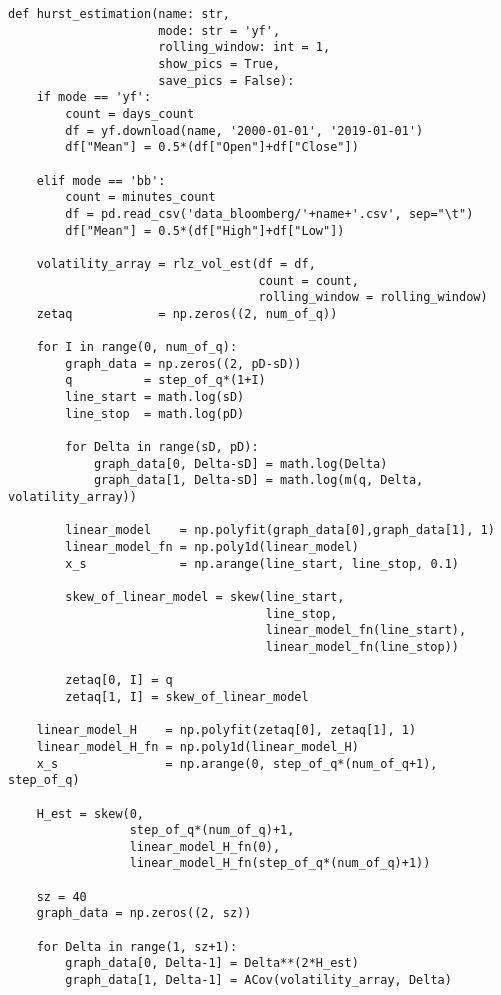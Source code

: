 \begin{verbatim}
def hurst_estimation(name: str, 
                     mode: str = 'yf', 
                     rolling_window: int = 1, 
                     show_pics = True, 
                     save_pics = False):
    if mode == 'yf':
        count = days_count
        df = yf.download(name, '2000-01-01', '2019-01-01')
        df["Mean"] = 0.5*(df["Open"]+df["Close"])

    elif mode == 'bb':
        count = minutes_count
        df = pd.read_csv('data_bloomberg/'+name+'.csv', sep="\t")  
        df["Mean"] = 0.5*(df["High"]+df["Low"])
        
    volatility_array = rlz_vol_est(df = df, 
                                   count = count, 
                                   rolling_window = rolling_window)
    zetaq            = np.zeros((2, num_of_q))

    for I in range(0, num_of_q):
        graph_data = np.zeros((2, pD-sD))
        q          = step_of_q*(1+I)
        line_start = math.log(sD)
        line_stop  = math.log(pD)
        
        for Delta in range(sD, pD):
            graph_data[0, Delta-sD] = math.log(Delta)
            graph_data[1, Delta-sD] = math.log(m(q, Delta, volatility_array))

        linear_model    = np.polyfit(graph_data[0],graph_data[1], 1)
        linear_model_fn = np.poly1d(linear_model)
        x_s             = np.arange(line_start, line_stop, 0.1)

        skew_of_linear_model = skew(line_start, 
                                    line_stop, 
                                    linear_model_fn(line_start), 
                                    linear_model_fn(line_stop))

        zetaq[0, I] = q
        zetaq[1, I] = skew_of_linear_model
    
    linear_model_H    = np.polyfit(zetaq[0], zetaq[1], 1)
    linear_model_H_fn = np.poly1d(linear_model_H)
    x_s               = np.arange(0, step_of_q*(num_of_q+1), step_of_q)

    H_est = skew(0, 
                 step_of_q*(num_of_q)+1, 
                 linear_model_H_fn(0), 
                 linear_model_H_fn(step_of_q*(num_of_q)+1))

    sz = 40
    graph_data = np.zeros((2, sz))

    for Delta in range(1, sz+1):
        graph_data[0, Delta-1] = Delta**(2*H_est)
        graph_data[1, Delta-1] = ACov(volatility_array, Delta)


\end{verbatim}
